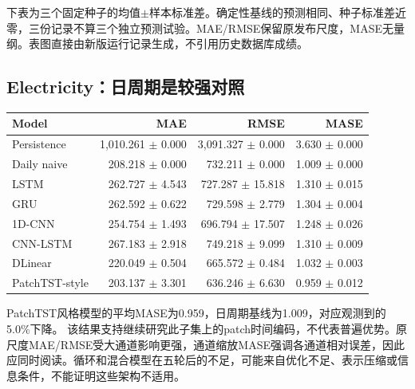 \documentclass[10pt,a4paper]{article}
\begin{document}
下表为三个固定种子的均值$\pm$样本标准差。确定性基线的预测相同、种子标准差近零，三份记录不算三个独立预测试验。MAE/RMSE保留原发布尺度，MASE无量纲。表图直接由新版运行记录生成，不引用历史数据库成绩。
\subsection{Electricity：日周期是较强对照}
\begin{center}\small
\begin{tabular}{lrrr}\toprule
Model & MAE & RMSE & MASE\\\midrule
Persistence & 1,010.261 $\pm$ 0.000 & 3,091.327 $\pm$ 0.000 & 3.630 $\pm$ 0.000\\
Daily naive & 208.218 $\pm$ 0.000 & 732.211 $\pm$ 0.000 & 1.009 $\pm$ 0.000\\
LSTM & 262.727 $\pm$ 4.543 & 727.287 $\pm$ 15.818 & 1.310 $\pm$ 0.015\\
GRU & 262.592 $\pm$ 0.622 & 729.598 $\pm$ 2.779 & 1.304 $\pm$ 0.004\\
1D-CNN & 254.754 $\pm$ 1.493 & 696.794 $\pm$ 17.507 & 1.248 $\pm$ 0.026\\
CNN-LSTM & 267.183 $\pm$ 2.918 & 749.218 $\pm$ 9.099 & 1.310 $\pm$ 0.009\\
DLinear & 220.049 $\pm$ 0.504 & 665.572 $\pm$ 0.484 & 1.032 $\pm$ 0.003\\
PatchTST-style & 203.137 $\pm$ 3.301 & 636.246 $\pm$ 6.630 & 0.959 $\pm$ 0.012\\
\bottomrule\end{tabular}\end{center}
PatchTST风格模型的平均MASE为0.959，日周期基线为1.009，对应观测到的5.0\%下降。
该结果支持继续研究此子集上的patch时间编码，不代表普遍优势。原尺度MAE/RMSE受大通道影响更强，通道缩放MASE强调各通道相对误差，因此应同时阅读。循环和混合模型在五轮后的不足，可能来自优化不足、表示压缩或信息条件，不能证明这些架构不适用。
\end{document}
